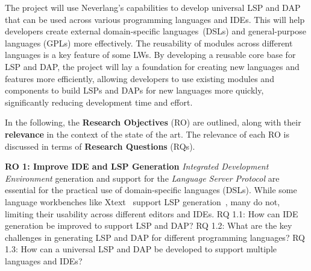 The project will use Neverlang's capabilities to develop universal LSP and DAP that can be used across various programming languages and IDEs. This will help developers create external domain-specific languages~\cite{Fowler10}(DSLs) and general-purpose languages (GPLs) more effectively. The reusability of modules across different languages is a key feature of some LWs. By developing a reusable core base for LSP and DAP, the project will lay a foundation for creating new languages and features more efficiently, allowing developers to use existing modules and components to build LSPs and DAPs for new languages more quickly, significantly reducing development time and effort.

\hfill \break
In the following, the \textbf{Research Objectives} (RO) are outlined, along with their \textbf{relevance} in the context of the state of the art. The relevance of each RO is discussed in terms of \textbf{Research Questions} (RQs).

\hfill \break
\noindent
\textbf{\hypertarget{ro1}{RO 1}: Improve IDE and LSP Generation}
\hfill \break
\textit{Integrated Development Environment} generation and support for the \textit{Language Server Protocol} are essential for the practical use of domain-specific languages (DSLs). While some language workbenches like Xtext~\cite{Bettini13b} support LSP generation~\cite{Barros22}, many do not, limiting their usability across different editors and IDEs.
\hfill \break
\textsf{\hypertarget{rq11}{RQ 1.1}}: How can IDE generation be improved to support LSP and DAP?
\hfill \break
\textsf{\hypertarget{rq12}{RQ 1.2}}: What are the key challenges in generating LSP and DAP for different programming languages?
\hfill \break
\textsf{\hypertarget{rq13}{RQ 1.3}}: How can a universal LSP and DAP be developed to support multiple languages and IDEs?

